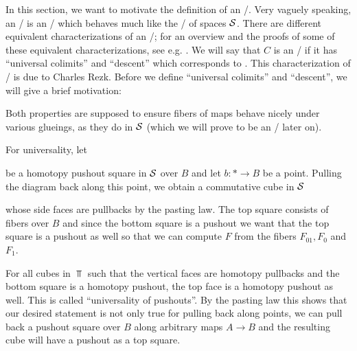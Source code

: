 In this section, we want to motivate the definition of an \inftytop/.
Very vaguely speaking, an \inftytop/ is an \inftycat/ which behaves much like the \inftycat/ of spaces $\mathcal{S}$.
There are different equivalent characterizations of an \inftytop/; for an overview and the proofs of some of these equivalent characterizations, see e.g. \cite[\S 6.1]{HTT}.
We will say that $C$ is an \inftytop/ if it has ``universal colimits'' and ``descent'' which corresponds to \cite[Theorem 6.1.0.6 (2)]{HTT}.
This characterization of \inftytops/ is due to Charles Rezk.
Before we define ``universal colimits'' and ``descent'', we will give a brief motivation:

Both properties are supposed to ensure fibers of maps behave nicely under various glueings, as they do in $\mathcal{S}$ (which we will prove to be an \inftytop/ later on).

For universality, let 
\begin{center}
\end{center}
be a homotopy pushout square in $\mathcal{S}$ over $B$ and let $b\colon*\to B$ be a point.
Pulling the diagram back along this point, we obtain a commutative cube in $\mathcal{S}$
\begin{center}
\end{center}
whose side faces are pullbacks by the pasting law.
The top square consists of fibers over $B$ and since the bottom square is a pushout we want that the top square is a pushout as well so that we can compute $F$ from the fibers $F_{01},F_0$ and $F_1$. 

For all cubes in $\Top$ such that the vertical faces are homotopy pullbacks and the bottom square is a homotopy pushout, the top face is a homotopy pushout as well.
This is called  ``universality of pushouts''.
By the pasting law this shows that our desired statement is not only true for pulling back along points, we can pull back a pushout square over $B$ along arbitrary maps $A\to B$ and the resulting cube will have a pushout as a top square.

